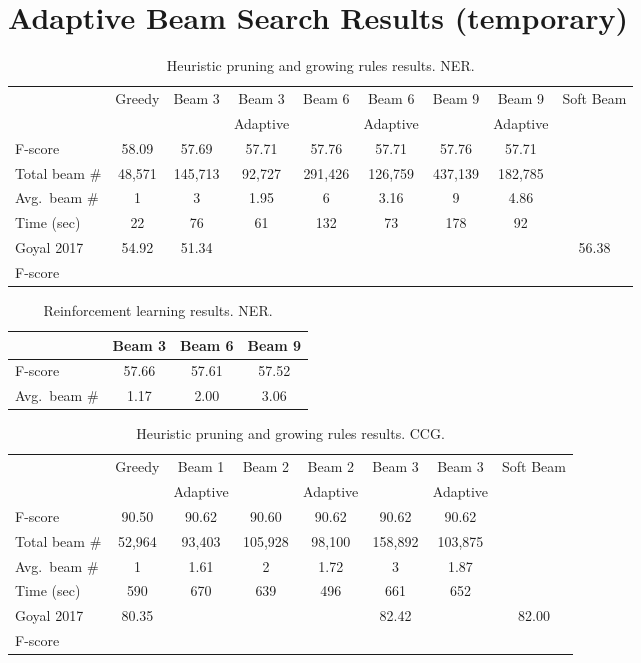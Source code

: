 \documentclass[11pt,a4paper]{article}
\begin{document}
\section{Adaptive Beam Search Results (temporary)}


\begin{table}
\centering
\caption{Heuristic pruning and growing rules results. NER.}
\begin{tabular}{lcccccccc}
\toprule
& Greedy & Beam 3 & Beam 3 & Beam 6 & Beam 6 & Beam 9 & Beam 9 & Soft Beam \\
& & & Adaptive & & Adaptive & & Adaptive & \\
\midrule
F-score & 58.09 & 57.69 & 57.71 & 57.76 & 57.71 & 57.76 & 57.71 & \\
Total beam \# & 48,571 & 145,713 & 92,727 & 291,426 & 126,759 & 437,139 & 182,785 & \\
Avg.~beam \# & 1 & 3 & 1.95 & 6 & 3.16 & 9 & 4.86 & \\
Time (sec) & 22 & 76 & 61 & 132 & 73 & 178 & 92 & \\
\midrule
Goyal 2017 & 54.92 & 51.34 & & & & & & 56.38 \\
F-score \\
\bottomrule
\end{tabular}
\end{table}




\begin{table}
\centering
\caption{Reinforcement learning results. NER.}
\begin{tabular}{lccc}
\toprule
& Beam 3 & Beam 6 & Beam 9 \\
\midrule
F-score & 57.66 & 57.61 & 57.52 \\
Avg.~beam \# & 1.17 & 2.00 & 3.06 \\
\bottomrule
\end{tabular}
\end{table}





\begin{table}
\centering
\caption{Heuristic pruning and growing rules results. CCG.}
\begin{tabular}{lccccccc}
\toprule
& Greedy & Beam 1 & Beam 2 & Beam 2 & Beam 3 & Beam 3 & Soft Beam \\
& & Adaptive & & Adaptive & & Adaptive & \\
\midrule
F-score & 90.50 & 90.62 & 90.60 & 90.62 & 90.62 & 90.62 &  \\
Total beam \# & 52,964 & 93,403 & 105,928 & 98,100 & 158,892 & 103,875 &  \\
Avg.~beam \# & 1 & 1.61 & 2 & 1.72 & 3 & 1.87 &  \\
Time (sec) & 590 & 670 & 639 & 496 & 661 & 652 &  \\
\midrule
Goyal 2017 & 80.35 &  & & & 82.42 & & 82.00 \\
F-score \\
\bottomrule
\end{tabular}
\end{table}
\end{document}
